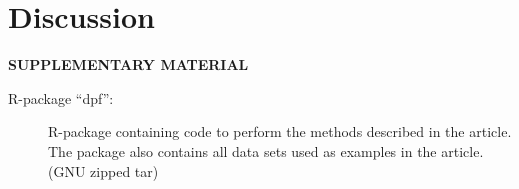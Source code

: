 \documentclass[12pt]{article}
\begin{document}
\section{Discussion}




\bigskip
\begin{center}
{\large\bf SUPPLEMENTARY MATERIAL}
\end{center}

\begin{description}

\item[R-package ``dpf'':] R-package containing code to perform the
  methods described in the article. The package also contains all data
  sets used as examples in the article. (GNU zipped tar)

\end{description}






\end{document}

